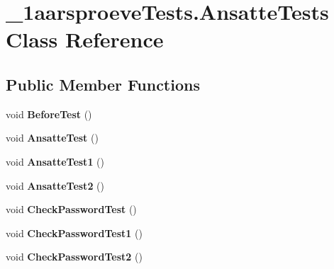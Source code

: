 \hypertarget{class__1aarsproeve_tests_1_1_ansatte_tests}{}\section{\+\_\+1aarsproeve\+Tests.\+Ansatte\+Tests Class Reference}
\label{class__1aarsproeve_tests_1_1_ansatte_tests}
\subsection*{Public Member Functions}
\begin{DoxyCompactItemize}
\item 
\hypertarget{class__1aarsproeve_tests_1_1_ansatte_tests_a78f0ba95ff295255c876c20bc56156d1}{}void {\bfseries Before\+Test} ()\label{class__1aarsproeve_tests_1_1_ansatte_tests_a78f0ba95ff295255c876c20bc56156d1}

\item 
\hypertarget{class__1aarsproeve_tests_1_1_ansatte_tests_aa3ae94e496e0f0f03dc90fe4c8b68921}{}void {\bfseries Ansatte\+Test} ()\label{class__1aarsproeve_tests_1_1_ansatte_tests_aa3ae94e496e0f0f03dc90fe4c8b68921}

\item 
\hypertarget{class__1aarsproeve_tests_1_1_ansatte_tests_ac0f8f99fb21be1a1fe1f714013155779}{}void {\bfseries Ansatte\+Test1} ()\label{class__1aarsproeve_tests_1_1_ansatte_tests_ac0f8f99fb21be1a1fe1f714013155779}

\item 
\hypertarget{class__1aarsproeve_tests_1_1_ansatte_tests_ada5ece990b9338864cad5ea58bf2443f}{}void {\bfseries Ansatte\+Test2} ()\label{class__1aarsproeve_tests_1_1_ansatte_tests_ada5ece990b9338864cad5ea58bf2443f}

\item 
\hypertarget{class__1aarsproeve_tests_1_1_ansatte_tests_a597cb46674a2f7417bb9a61f821854a2}{}void {\bfseries Check\+Password\+Test} ()\label{class__1aarsproeve_tests_1_1_ansatte_tests_a597cb46674a2f7417bb9a61f821854a2}

\item 
\hypertarget{class__1aarsproeve_tests_1_1_ansatte_tests_aee8edf5afda59441655da5f9914fdecb}{}void {\bfseries Check\+Password\+Test1} ()\label{class__1aarsproeve_tests_1_1_ansatte_tests_aee8edf5afda59441655da5f9914fdecb}

\item 
\hypertarget{class__1aarsproeve_tests_1_1_ansatte_tests_acc2264dcd04cf2e86f71dc310f0b9bb8}{}void {\bfseries Check\+Password\+Test2} ()\label{class__1aarsproeve_tests_1_1_ansatte_tests_acc2264dcd04cf2e86f71dc310f0b9bb8}


\end{DoxyCompactItemize}
